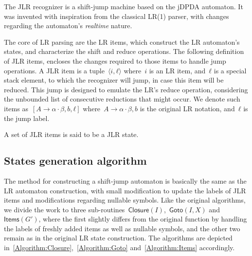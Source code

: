 \def\function#1(#2){\ensuremath{\textsf{#1}(#2)}}
\def\table#1[#2]{\ensuremath{\textsf{#1}[#2]}}

The JLR recognizer is a shift-jump machine
  based on the jDPDA automaton.
It was invented with inspiration from the classical
  LR(1) parser, with changes regarding the automaton's
  \emph{realtime} nature.

The core of LR parsing are the LR items,
  which construct the LR automaton's states, and
  characterize the shift and reduce operations.
The following definition of JLR items,
  encloses the changes required to those items to handle
  jump operations.
A JLR item is a tuple~$⟨i,ℓ⟩$ where~$i$ is an
  LR item, and~$ℓ$ is a special stack element,
  to which the recognizer will jump, in case this item will
  be reduced.
This jump is designed to emulate the LR's
  reduce operation, considering the unbounded list of consecutive
  reductions that might occur.
We denote such items as~$[A→α·β, b ,ℓ]$
  where~$A→α·β, b$ is the original LR notation, and~$ℓ$
  is the jump label.

A set of JLR items is said to be a JLR state.

\subsection{States generation algorithm}
The method for constructing a shift-jump automaton
  is basically the same as the LR automaton construction,
  with small modification to update the labels of JLR items
  and modifications regarding nullable symbols.
Like the original algorithms, we divide the work to three
  sub-routines~$\function Closure(I)$,~$\function Goto(I,X)$ and~$\function Items(G')$,
  where the first slightly differs from the original function by handling the
  labels of freshly added items as well as nullable symbols,
  and the other two remain as in the original LR state construction.
The algorithms are depicted in~\cref{Algorithm:Closure},~\cref{Algorithm:Goto}
  and~\cref{Algorithm:Items} accordingly.

\newcommand\INPUT\REQUIRE
\newcommand\OUTPUT\ENSURE
\renewcommand{\LET}[2]{\STATE{\textbf{Let} \ensuremath{\text{#1}←\text{#2}}}}
\renewcommand{\algorithmicrequire}{\textbf{Input}}
\renewcommand{\algorithmicensure}{\textbf{Output}}


